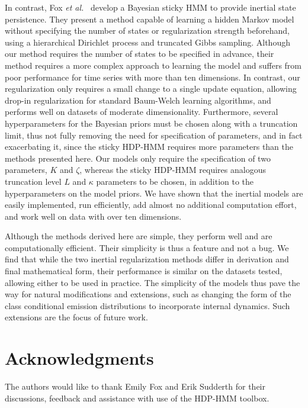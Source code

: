 \documentclass[letterpaper]{article}
\begin{document}
In contrast, Fox \emph{et al.}\ \cite{fox2011sticky} develop a Bayesian sticky HMM to provide inertial state persistence. They present a method capable of learning a hidden Markov model without specifying the number of states or regularization strength beforehand, using a hierarchical Dirichlet process and truncated Gibbs sampling. Although our method requires the number of states to be specified in advance, their method requires a more complex approach to learning the model and suffers from poor performance for time series with more than ten dimensions. In contrast, our regularization only requires a small change to a single update equation, allowing drop-in regularization for standard Baum-Welch learning algorithms, and performs well on datasets of moderate dimensionality. Furthermore, several hyperparameters for the Bayesian priors must be chosen along with a truncation limit, thus not fully removing the need for specification of parameters, and in fact exacerbating it, since the sticky HDP-HMM requires more parameters than the methods presented here. Our models only require the specification of two parameters, $K$ and $\zeta$, whereas the sticky HDP-HMM requires analogous truncation level $L$ and $\kappa$ parameters to be chosen, in addition to the hyperparameters on the model priors. We have shown that the inertial models are easily implemented, run efficiently, add almost no additional computation effort, and work well on data with over ten dimensions.

Although the methods derived here are simple, they perform well and are computationally efficient. Their simplicity is thus a feature and not a bug. We find that while the two inertial regularization methods differ in derivation and final mathematical form, their performance is similar on the datasets tested, allowing either to be used in practice.  The simplicity of the models thus pave the way for natural modifications and extensions, such as changing the form of the class conditional emission distributions to incorporate internal dynamics. Such extensions are the focus of future work.

\section{Acknowledgments}

The authors would like to thank Emily Fox and Erik Sudderth for their discussions, feedback and assistance with use of the HDP-HMM toolbox.



\end{document}

